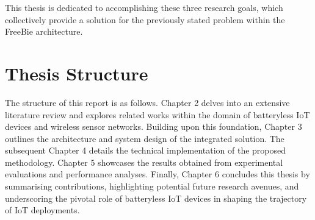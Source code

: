 \noindent This thesis is dedicated to accomplishing these three research goals, which collectively provide a solution for the previously stated problem within the FreeBie architecture.

\section{Thesis Structure}
The structure of this report is as follows. Chapter 2 delves into an extensive literature review and explores related works within the domain of batteryless IoT devices and wireless sensor networks. Building upon this foundation, Chapter 3 outlines the architecture and system design of the integrated solution. The subsequent Chapter 4 details the technical implementation of the proposed methodology. Chapter 5 showcases the results obtained from experimental evaluations and performance analyses. Finally, Chapter 6 concludes this thesis by summarising contributions, highlighting potential future research avenues, and underscoring the pivotal role of batteryless IoT devices in shaping the trajectory of IoT deployments.
